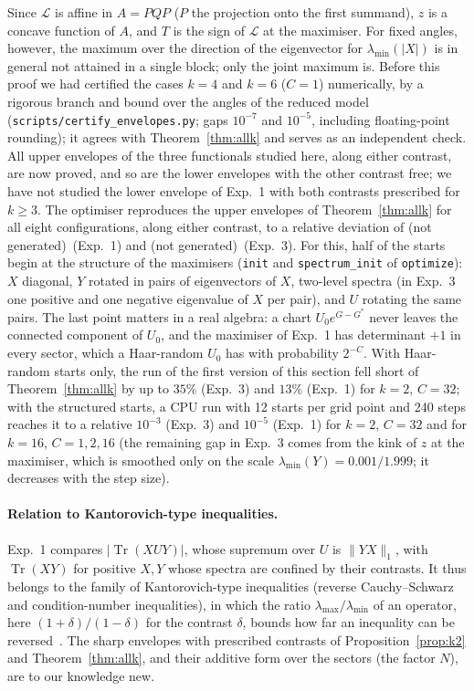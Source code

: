 \documentclass[11pt]{article}
\DeclareMathOperator{\Tr}{Tr}
\providecommand{\BoundsSupDevOne}{(not generated)}\providecommand{\BoundsSupDevThree}{(not generated)}
\begin{document}
\noindent Since $\mathcal L$ is affine in $A=PQP$ ($P$ the projection onto the first summand), $z$ is a concave
function of $A$, and $T$ is the sign of $\mathcal L$ at the maximiser. For fixed angles, however, the maximum over the
direction of the eigenvector for $\lambda_{\min}(|X|)$ is in general not attained in a single block; only the joint
maximum is. Before this proof we had certified the cases $k=4$ and $k=6$ ($C=1$) numerically, by a rigorous branch and
bound over the angles of the reduced model (\texttt{scripts/certify\_envelopes.py}; gaps $10^{-7}$ and $10^{-5}$,
including floating-point rounding); it agrees with Theorem~\ref{thm:allk} and serves as an independent check. All
upper envelopes of the three functionals studied here, along either contrast, are now proved, and so are the lower
envelopes with the other contrast free; we have not studied the lower envelope of Exp.~1 with both contrasts
prescribed for $k\ge3$. The optimiser reproduces the upper envelopes of Theorem~\ref{thm:allk} for all eight
configurations, along either contrast, to a relative deviation of \BoundsSupDevOne\ (Exp.~1) and \BoundsSupDevThree\
(Exp.~3). For this, half of the starts begin at the structure of the maximisers
(\texttt{init} and \texttt{spectrum\_init} of \texttt{optimize}): $X$ diagonal, $Y$ rotated in pairs of eigenvectors of
$X$, two-level spectra (in Exp.~3 one positive and one negative eigenvalue of $X$ per pair), and $U$ rotating the same
pairs. The last point matters in a real algebra: a chart $U_0e^{G-G^*}$ never leaves the connected component of
$U_0$, and the maximiser of Exp.~1 has determinant $+1$ in every sector, which a Haar-random $U_0$ has with probability
$2^{-C}$. With Haar-random starts only, the run of the first version of this section fell short of
Theorem~\ref{thm:allk} by up to $35\%$ (Exp.~3) and $13\%$ (Exp.~1) for $k=2$, $C=32$; with the structured starts, a CPU
run with 12 starts per grid point and 240 steps reaches it to a relative $10^{-3}$ (Exp.~3) and $10^{-5}$ (Exp.~1)
for $k=2$, $C=32$ and for $k=16$, $C=1,2,16$ (the remaining gap in Exp.~3 comes from the kink of $z$ at the maximiser,
which is smoothed only on the scale $\lambda_{\min}(Y)=0.001/1.999$; it decreases with the step size).

\paragraph{Relation to Kantorovich-type inequalities.} Exp.~1 compares $|\Tr(XUY)|$, whose supremum over $U$ is
$\|YX\|_1$, with $\Tr(XY)$ for positive $X,Y$ whose spectra are confined by their contrasts. It thus belongs to the
family of Kantorovich-type inequalities (reverse Cauchy--Schwarz and condition-number inequalities), in which the ratio
$\lambda_{\max}/\lambda_{\min}$ of an operator, here $(1+\delta)/(1-\delta)$ for the contrast $\delta$, bounds how
far an inequality can be reversed~\cite{greub1959,furuta2005}. The sharp envelopes with prescribed contrasts of
Proposition~\ref{prop:k2} and Theorem~\ref{thm:allk}, and their additive form over the sectors (the factor $N$), are
to our knowledge new.
\end{document}
